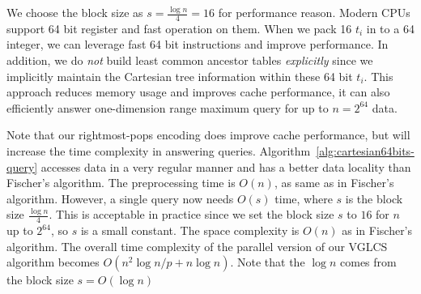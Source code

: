 

We choose the block size as $s = {{\frac{\log n}{4}}} = 16$ for
performance reason.  Modern CPUs support 64 bit register and fast
operation on them.  When we pack 16 $t_i$ in to a 64 integer, we can
leverage fast 64 bit instructions and improve performance.  In addition,
we do {\em not} build least common ancestor tables {\em explicitly}
since we implicitly maintain the Cartesian tree information within these
64 bit $t_i$.  This approach reduces memory usage and improves cache
performance, it can also efficiently answer one-dimension range maximum
query for up to $n = 2^{64}$ data.

Note that our rightmost-pops encoding does improve cache performance,
but will increase the time complexity in answering queries.
Algorithm~\ref{alg:cartesian64bits-query} accesses data in a very
regular manner and has a better data locality than Fischer's algorithm.
The preprocessing time is $O(n)$, as same as in Fischer's algorithm.
However, a single query now needs $O(s)$ time, where $s$ is the block
size ${{\frac{\log n}{4}}}$.  This is acceptable in practice since we
set the block size $s$ to $16$ for $n$ up to $2^{64}$, so $s$ is a small
constant.  The space complexity is $O(n)$ as in Fischer's algorithm. The
overall time complexity of the parallel version of our VGLCS algorithm
becomes $O(n^2 \log{n} / p + n \log n)$.  Note that the $\log n$ comes
from the block size $s = O(\log n)$
